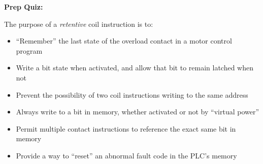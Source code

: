 \vfil \eject

\noindent
{\bf Prep Quiz:}

The purpose of a {\it retentive} coil instruction is to:

\begin{itemize}
\item{} ``Remember'' the last state of the overload contact in a motor control program
\vskip 5pt 
\item{} Write a bit state when activated, and allow that bit to remain latched when not
\vskip 5pt 
\item{} Prevent the possibility of two coil instructions writing to the same address
\vskip 5pt 
\item{} Always write to a bit in memory, whether activated or not by ``virtual power''
\vskip 5pt 
\item{} Permit multiple contact instructions to reference the exact same bit in memory
\vskip 5pt 
\item{} Provide a way to ``reset'' an abnormal fault code in the PLC's memory
\end{itemize}




